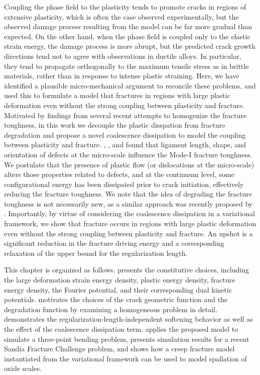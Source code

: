 Coupling the phase field to the plasticity tends to promote cracks in regions of extensive plasticity, which is often the case observed experimentally, but the observed damage process resulting from the model can be far more gradual than expected. On the other hand, when the phase field is coupled only to the elastic strain energy, the damage process is more abrupt, but the predicted crack growth directions tend not to agree with observations in ductile alloys.  In particular, they tend to propagate orthogonally to the maximum tensile stress as in brittle materials, rather than in response to intense plastic straining. Here, we have identified a plausible micro-mechanical argument to reconcile these problems, and used this to formulate a model that fractures in regions with large plastic deformation even without the strong coupling between plasticity and fracture. Motivated by findings from several recent attempts to homogenize the fracture toughness, in this work we decouple the plastic disspation from fracture degradation and propose a novel coalescence dissipation to model the coupling between plasticity and fracture. \citet{rodriguez2016silica}, \citet{chowdhury2019effects}, and \citet{vo2020molecular} found that ligament length, shape, and orientation of defects at the micro-scale influence the Mode-I fracture toughness. We postulate that the presence of plastic flow (or dislocations at the micro-scale) alters those properties related to defects, and at the continuum level, some configurational energy has been dissipated prior to crack initiation, effectively reducing the fracture toughness. We note that the idea of degrading the fracture toughness is not necessarily new, as a similar approach was recently proposed by \citet{yin2020ductile}. Importantly, by virtue of considering the coalescence dissipation in a variational framework, we show that fracture occurs in regions with large plastic deformation even without the strong coupling between plasticity and fracture.  An upshot is a significant reduction in the fracture driving energy and a corresponding relaxation of the upper bound for the regularization length.


This chapter is organized as follows.  presents the constitutive choices, including the large deformation strain energy density, plastic energy density, fracture energy density, the Fourier potential, and their corresponding dual kinetic potentials.
 motivates the choices of the crack geometric function and the degradation function by examining a homogeneous problem in detail.  demonstrates the regularization-length-independent softening behavior as well as the effect of the coalescence dissipation term.
 applies the proposed model to simulate a three-point bending problem,  presents simulation results for a recent Sandia Fracture Challenge problem, and  shows how a creep fracture model instantiated from the variational framework can be used to model spallation of oxide scales.
